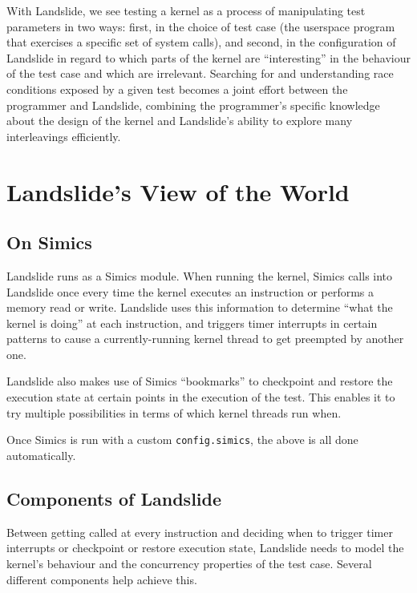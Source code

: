 \documentclass{article}
\begin{document}
With Landslide, we see testing a kernel as a process of manipulating test parameters in two ways: first, in the choice of test case (the userspace program that exercises a specific set of system calls), and second, in the configuration of Landslide in regard to which parts of the kernel are ``interesting'' in the behaviour of the test case and which are irrelevant.
Searching for and understanding race conditions exposed by a given test becomes a joint effort between the programmer and Landslide, combining the programmer's specific knowledge about the design of the kernel and Landslide's ability to explore many interleavings efficiently.

\section{Landslide's View of the World}
\subsection{On Simics}

Landslide runs as a Simics module. When running the kernel, Simics calls into Landslide once every time the kernel executes an instruction or performs a memory read or write. Landslide uses this information to determine ``what the kernel is doing'' at each instruction, and triggers timer interrupts in certain patterns to cause a currently-running kernel thread to get preempted by another one.

Landslide also makes use of Simics ``bookmarks'' to checkpoint and restore the execution state at certain points in the execution of the test. This enables it to try multiple possibilities in terms of which kernel threads run when.

Once Simics is run with a custom \texttt{config.simics}, the above is all done automatically.

\subsection{Components of Landslide}

Between getting called at every instruction and deciding when to trigger timer interrupts or checkpoint or restore execution state, Landslide needs to model the kernel's behaviour and the concurrency properties of the test case. Several different components help achieve this.
\end{document}
